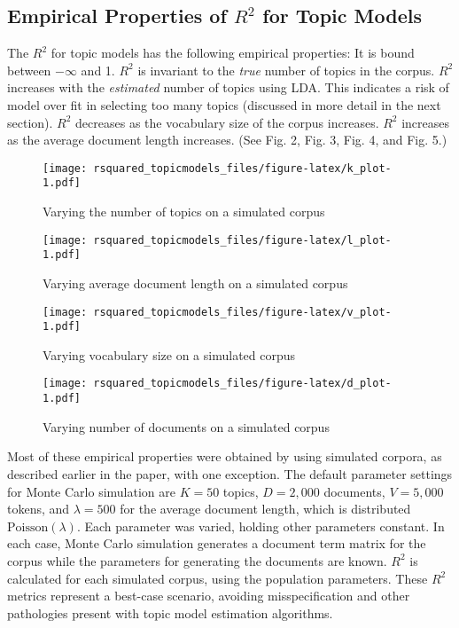 \documentclass[conference,final,]{IEEEtran}
\makeatletter
\def\maxwidth{\ifdim\Gin@nat@width>\linewidth\linewidth
\else\Gin@nat@width\fi}
\let\Oldincludegraphics\includegraphics
\renewcommand{\includegraphics}[1]{\Oldincludegraphics[width=\maxwidth]{#1}}
\makeatother
\begin{document}
\hypertarget{empirical-properties-of-r2-for-topic-models}{%
\subsection{\texorpdfstring{Empirical Properties of \(R^2\) for Topic
Models}{Empirical Properties of R\^{}2 for Topic Models}}\label{empirical-properties-of-r2-for-topic-models}}

The \(R^2\) for topic models has the following empirical properties: It
is bound between \(-\infty\) and 1. \(R^2\) is invariant to the
\textit{true} number of topics in the corpus. \(R^2\) increases with the
\textit{estimated} number of topics using LDA. This indicates a risk of
model over fit in selecting too many topics (discussed in more detail in
the next section). \(R^2\) decreases as the vocabulary size of the
corpus increases. \(R^2\) increases as the average document length
increases. (See Fig. 2, Fig. 3, Fig. 4, and Fig. 5.)

\begin{figure}
\centering
\texttt{[image: rsquared\_topicmodels\_files/figure-latex/k\_plot-1.pdf]}
\caption{Varying the number of topics on a simulated corpus}
\end{figure}

\begin{figure}
\centering
\texttt{[image: rsquared\_topicmodels\_files/figure-latex/l\_plot-1.pdf]}
\caption{Varying average document length on a simulated corpus}
\end{figure}

\begin{figure}
\centering
\texttt{[image: rsquared\_topicmodels\_files/figure-latex/v\_plot-1.pdf]}
\caption{Varying vocabulary size on a simulated corpus}
\end{figure}

\begin{figure}
\centering
\texttt{[image: rsquared\_topicmodels\_files/figure-latex/d\_plot-1.pdf]}
\caption{Varying number of documents on a simulated corpus}
\end{figure}

Most of these empirical properties were obtained by using simulated
corpora, as described earlier in the paper, with one exception. The
default parameter settings for Monte Carlo simulation are \(K = 50\)
topics, \(D = 2,000\) documents, \(V = 5,000\) tokens, and
\(\lambda = 500\) for the average document length, which is distributed
\(\text{Poisson}(\lambda)\). Each parameter was varied, holding other
parameters constant. In each case, Monte Carlo simulation generates a
document term matrix for the corpus while the parameters for generating
the documents are known. \(R^2\) is calculated for each simulated
corpus, using the population parameters. These \(R^2\) metrics represent
a best-case scenario, avoiding misspecification and other pathologies
present with topic model estimation algorithms.
\end{document}
